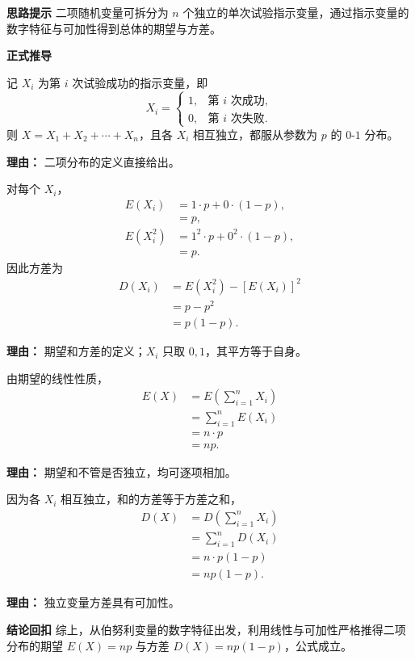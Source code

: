 \begin{proofbox}
	\textbf{\textcolor{CProof}{思路提示}}
	二项随机变量可拆分为 $n$ 个独立的单次试验指示变量，通过指示变量的数字特征与可加性得到总体的期望与方差。

	\medskip
	\textbf{\textcolor{CProof}{正式推导}}
	\begin{description}[style=nextline, leftmargin=2.8em, labelsep=0.5em, itemsep=0.55em]
		\item[\textbf{步骤一（分解为指示变量）：}]
			记 $X_i$ 为第 $i$ 次试验成功的指示变量，即
			\[
				X_i=
				\begin{cases}
					1, & \text{第 $i$ 次成功},\\ 0, & \text{第 $i$ 次失败}.
			\end{cases}
			\]
			则 $X=X_1+X_2+\cdots+X_n$，且各 $X_i$ 相互独立，都服从参数为 $p$ 的 $0$-$1$ 分布。
			\par\textbf{理由：} 二项分布的定义直接给出。
		\item[\textbf{步骤二（计算伯努利方差）：}]
			对每个 $X_i$，
			\[
				\begin{aligned}
					E(X_i) &= 1\cdot p + 0\cdot(1-p), \\ &= p, \\ E(X_i^2) &= 1^2\cdot p + 0^2\cdot(1-p), \\ &= p.
			\end{aligned}
			\]
			因此方差为
			\[
				\begin{aligned}
					D(X_i) &= E(X_i^2) - [E(X_i)]^2 \\ &= p - p^2 \\ &= p(1-p).
			\end{aligned}
			\]
			\par\textbf{理由：} 期望和方差的定义；$X_i$ 只取 $0,1$，其平方等于自身。
		\item[\textbf{步骤三（利用期望可加性）：}]
			由期望的线性性质，
			\[
				\begin{aligned}
					E(X) &= E\!\left(\sum_{i=1}^n X_i\right) \\ &= \sum_{i=1}^n E(X_i) \\ &= n\cdot p \\ &= np.
			\end{aligned}
			\]
			\par\textbf{理由：} 期望和不管是否独立，均可逐项相加。
		\item[\textbf{步骤四（利用方差可加性）：}]
			因为各 $X_i$ 相互独立，和的方差等于方差之和，
			\[
				\begin{aligned}
					D(X) &= D\!\left(\sum_{i=1}^n X_i\right) \\ &= \sum_{i=1}^n D(X_i) \\ &= n\cdot p(1-p) \\ &= np(1-p).
			\end{aligned}
			\]
			\par\textbf{理由：} 独立变量方差具有可加性。
	\end{description}

	\medskip
	\textbf{\textcolor{CProof}{结论回扣}}
	综上，从伯努利变量的数字特征出发，利用线性与可加性严格推得二项分布的期望 $E(X)=np$ 与方差 $D(X)=np(1-p)$，公式成立。
\end{proofbox}
